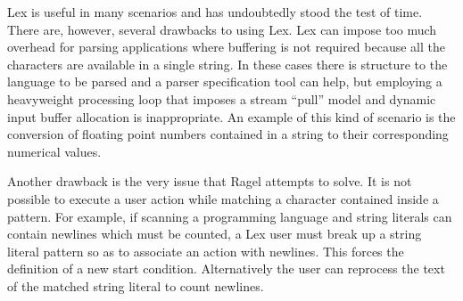 \documentclass[letterpaper,11pt,oneside]{book}
\begin{document}
Lex is useful in many scenarios and has undoubtedly stood the test of time.
There are, however, several drawbacks to using Lex.  Lex can impose too much
overhead for parsing applications where buffering is not required because all
the characters are available in a single string.  In these cases there is
structure to the language to be parsed and a parser specification tool can
help, but employing a heavyweight processing loop that imposes a stream
``pull'' model and dynamic input buffer allocation is inappropriate.  An
example of this kind of scenario is the conversion of floating point numbers
contained in a string to their corresponding numerical values.

Another drawback is the very issue that Ragel attempts to solve.
It is not possible to execute a user action while
matching a character contained inside a pattern. For example, if scanning a
programming language and string literals can contain newlines which must be
counted, a Lex user must break up a string literal pattern so as to associate
an action with newlines. This forces the definition of a new start condition.
Alternatively the user can reprocess the text of the matched string literal to
count newlines. 
\end{document}
